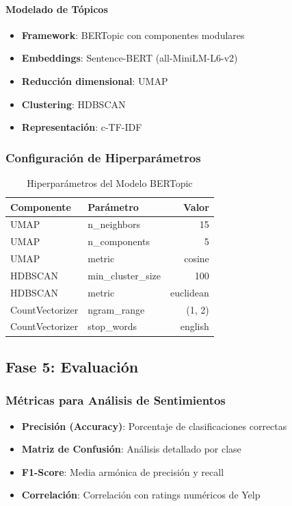 \documentclass[12pt,a4paper,twoside,openany]{book}
\begin{document}
\paragraph{Modelado de Tópicos}
\begin{itemize}
    \item \textbf{Framework}: BERTopic con componentes modulares
    \item \textbf{Embeddings}: Sentence-BERT (all-MiniLM-L6-v2)
    \item \textbf{Reducción dimensional}: UMAP
    \item \textbf{Clustering}: HDBSCAN
    \item \textbf{Representación}: c-TF-IDF
\end{itemize}

\subsubsection{Configuración de Hiperparámetros}

\begin{table}[H]
\centering
\caption{Hiperparámetros del Modelo BERTopic}
\begin{tabular}{@{}llr@{}}
\toprule
\textbf{Componente} & \textbf{Parámetro} & \textbf{Valor} \\
\midrule
UMAP & n\_neighbors & 15 \\
UMAP & n\_components & 5 \\
UMAP & metric & cosine \\
HDBSCAN & min\_cluster\_size & 100 \\
HDBSCAN & metric & euclidean \\
CountVectorizer & ngram\_range & (1, 2) \\
CountVectorizer & stop\_words & english \\
\bottomrule
\end{tabular}
\end{table}

\subsection{Fase 5: Evaluación}

\subsubsection{Métricas para Análisis de Sentimientos}

\begin{itemize}
    \item \textbf{Precisión (Accuracy)}: Porcentaje de clasificaciones correctas
    \item \textbf{Matriz de Confusión}: Análisis detallado por clase
    \item \textbf{F1-Score}: Media armónica de precisión y recall
    \item \textbf{Correlación}: Correlación con ratings numéricos de Yelp
\end{itemize}
\end{document}
